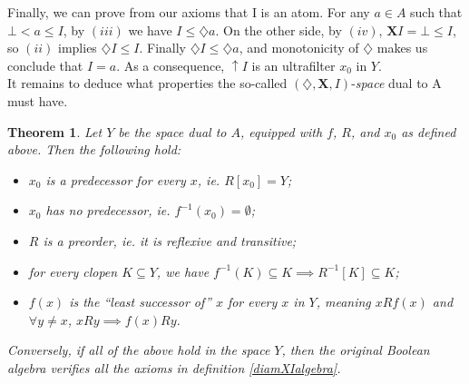 \documentclass[11pt]{article}
\newtheorem{theorem}[definition]{Theorem}
\begin{document}
Finally, we can prove from our axioms that I is an atom.
For any $a \in A$ such that $\bot < a\leq I$, by $(iii)$ we have $I\leq \diamondsuit a$.
On the other side, by $(iv)$, $\mathbf{X}I =\bot \leq I$, so $(ii)$ implies $\diamondsuit I \leq I$.
Finally $\diamondsuit I \leq \diamondsuit a$, and monotonicity of $\diamondsuit$ makes us conclude that $I=a$.
As a consequence, $\uparrow I$ is an ultrafilter $x_0$ in $Y$.\\
It remains to deduce what properties the so-called $(\diamondsuit,\mathbf{X},I)$-\emph{space} dual to A must have.

\begin{theorem}\label{duality}
    Let $Y$ be the space dual to $A$, equipped with $f$, $R$, and $x_0$ as defined above. Then the following hold:
    \begin{itemize}
        \item $x_0$ is a predecessor for every $x$, \emph{ie.} $R[x_0] = Y$;
        \item $x_0$ has no predecessor, \emph{ie.} $f^{-1}(x_0) =  \emptyset$;
        \item $R$ is a preorder, \emph{ie.} it is reflexive and transitive;
        \item for every clopen $K \subseteq Y$, we have $f^{-1}(K)\subseteq K \implies R^{-1}[K]\subseteq K$;
        \item $f(x)$ is the ``least successor of'' $x$ for every $x$ in $Y$, meaning $x R f(x)$ and $\forall y \neq x$, $x R y \implies f(x) R y$.
    \end{itemize}
    Conversely, if all of the above hold in the space $Y$, then the original Boolean algebra verifies all the axioms in definition \ref{diamXIalgebra}.
\end{theorem}
\end{document}
